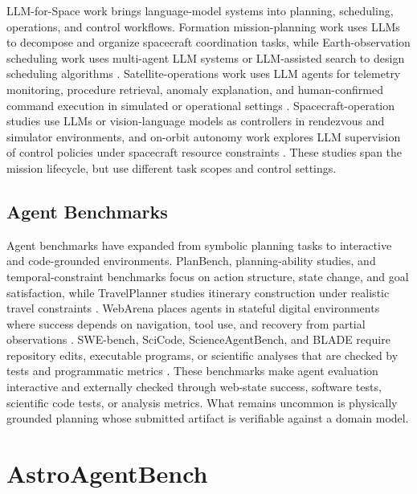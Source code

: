 \documentclass[11pt]{article}
\begin{document}
LLM-for-Space work brings language-model systems into planning, scheduling, operations, and control workflows. Formation mission-planning work uses LLMs to decompose and organize spacecraft coordination tasks, while Earth-observation scheduling work uses multi-agent LLM systems or LLM-assisted search to design scheduling algorithms \citep{zhang2025large,chen2025large,evalns_2026_llm_satellite_scheduling}. Satellite-operations work uses LLM agents for telemetry monitoring, procedure retrieval, anomaly explanation, and human-confirmed command execution in simulated or operational settings \citep{campanelli_2025_llm_satellite_ops,esa_2024_a2i_roadmap}. Spacecraft-operation studies use LLMs or vision-language models as controllers in rendezvous and simulator environments, and on-orbit autonomy work explores LLM supervision of control policies under spacecraft resource constraints \citep{carrasco2025large,mousist_2025_astrea}. These studies span the mission lifecycle, but use different task scopes and control settings.

\subsection{Agent Benchmarks}

Agent benchmarks have expanded from symbolic planning tasks to interactive and code-grounded environments. PlanBench, planning-ability studies, and temporal-constraint benchmarks focus on action structure, state change, and goal satisfaction, while TravelPlanner studies itinerary construction under realistic travel constraints \citep{valmeekam2023planning,valmeekam2023planbench,ding2025tcp,xie2024travelplanner}. WebArena places agents in stateful digital environments where success depends on navigation, tool use, and recovery from partial observations \citep{zhouwebarena}. SWE-bench, SciCode, ScienceAgentBench, and BLADE require repository edits, executable programs, or scientific analyses that are checked by tests and programmatic metrics \citep{jimenezswe,scicode_2024,scienceagentbench_2025,gu2024blade}. These benchmarks make agent evaluation interactive and externally checked through web-state success, software tests, scientific code tests, or analysis metrics. What remains uncommon is physically grounded planning whose submitted artifact is verifiable against a domain model.

\section{AstroAgentBench}
\label{sec:benchmark}
\end{document}
